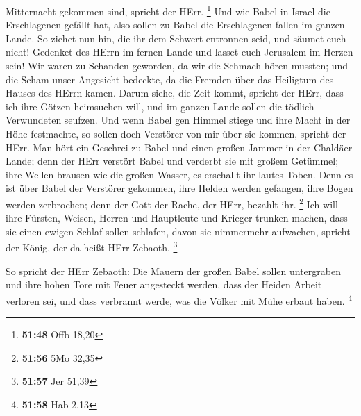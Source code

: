 Mitternacht gekommen sind, spricht der HErr. \footnote{\textbf{51:48}
  Offb 18,20}  Und wie Babel in Israel die Erschlagenen
gefällt hat, also sollen zu Babel die Erschlagenen fallen im ganzen
Lande.  So ziehet nun hin, die ihr dem Schwert entronnen
seid, und säumet euch nicht! Gedenket des HErrn im fernen Lande und
lasset euch Jerusalem im Herzen sein!  Wir waren zu
Schanden geworden, da wir die Schmach hören mussten; und die Scham unser
Angesicht bedeckte, da die Fremden über das Heiligtum des Hauses des
HErrn kamen.  Darum siehe, die Zeit kommt, spricht der
HErr, dass ich ihre Götzen heimsuchen will, und im ganzen Lande sollen
die tödlich Verwundeten seufzen.  Und wenn Babel gen Himmel
stiege und ihre Macht in der Höhe festmachte, so sollen doch Verstörer
von mir über sie kommen, spricht der HErr.  Man hört ein
Geschrei zu Babel und einen großen Jammer in der Chaldäer Lande;
 denn der HErr verstört Babel und verderbt sie mit großem
Getümmel; ihre Wellen brausen wie die großen Wasser, es erschallt ihr
lautes Toben.  Denn es ist über Babel der Verstörer
gekommen, ihre Helden werden gefangen, ihre Bogen werden zerbrochen;
denn der Gott der Rache, der HErr, bezahlt ihr. \footnote{\textbf{51:56}
  5Mo 32,35}  Ich will ihre Fürsten, Weisen, Herren und
Hauptleute und Krieger trunken machen, dass sie einen ewigen Schlaf
sollen schlafen, davon sie nimmermehr aufwachen, spricht der König, der
da heißt HErr Zebaoth. \footnote{\textbf{51:57} Jer 51,39}

 So spricht der HErr Zebaoth: Die Mauern der großen Babel
sollen untergraben und ihre hohen Tore mit Feuer angesteckt werden, dass
der Heiden Arbeit verloren sei, und dass verbrannt werde, was die Völker
mit Mühe erbaut haben. \footnote{\textbf{51:58} Hab 2,13}

